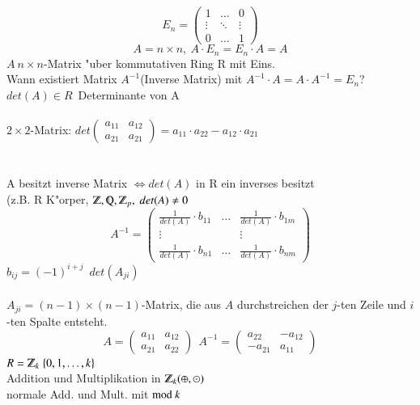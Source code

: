 \[
E_n=\begin{pmatrix}
	1 & \ldots & 0 \\
	\vdots & \ddots & \vdots \\
	0 & \ldots & 1
\end{pmatrix}
\]
\[
A=n\times n,\ A \cdot E_n=E_n \cdot A = A
\]
$A\ n\times n$-Matrix "uber kommutativen Ring R mit Eins.\\
Wann existiert Matrix $A^{-1}$(Inverse Matrix) mit $A^{-1} \cdot A = A \cdot A^{-1} = E_n$?\\
$det(A) \in R$\ Determinante von A\\
\\
$2\times 2$-Matrix: $det\begin{pmatrix}
	a_{11} & a_{12} \\ a_{21} & a_{21}
\end{pmatrix}
= a_{11} \cdot a_{22} - a_{12} \cdot a_{21}$\\
\\
\\
A besitzt inverse Matrix $\Leftrightarrow det(A)$ in R ein inverses besitzt\\
(z.B. R K"orper, $\Z ,\Q ,\Z_p,\ det(A)\neq 0$\\
\[
A^{-1}=
\begin{pmatrix}
	\frac{1}{det(A)}\cdot b_{11} & \ldots & \frac{1}{det(A)}\cdot b_{1m} \\
	\vdots & & \vdots \\
	\frac{1}{det(A)}\cdot b_{n1} & \ldots & \frac{1}{det(A)}\cdot b_{nm}
\end{pmatrix}
\]
$b_{ij}=(-1)^{i+j}$\ $det(A_{ji})$\\
\\
$A_{ji}=(n-1)\times (n-1)$-Matrix, die aus $A$ durchstreichen der $j$-ten Zeile und $i$-ten Spalte entsteht.
\[
A=
\begin{pmatrix}
	a_{11} & a_{12} \\ a_{21} & a_{22}
\end{pmatrix}\ \
A^{-1}=
\begin{pmatrix}
	a_{22} & -a_{12} \\ -a_{21} & a_{11}
\end{pmatrix}
\]
$R=\Z_k \ \{0,1,\ldots,k\}$\\
Addition und Multiplikation in $\Z_k (\oplus,\odot)$\\
normale Add. und Mult. mit $\text{mod }k$\\

